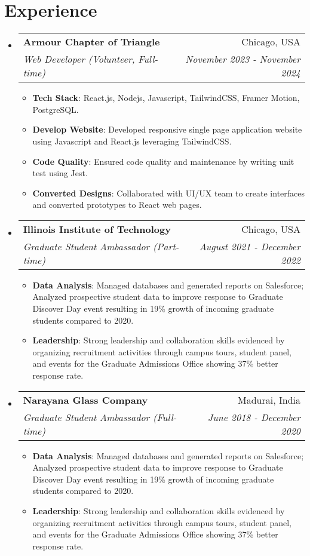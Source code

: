 \documentclass[a4paper,20pt]{article}
\makeatletter
\newcommand{\resumeItem}[2]{
  \item\small{
    \textbf{#1}{: #2 \vspace{-2pt}}
  }
}
\newcommand{\resumeSubheading}[4]{
  \vspace{-1pt}\item
    \begin{tabular*}{0.97\textwidth}{l@{\extracolsep{\fill}}r}
      \textbf{#1} & #2 \\
      \textit{#3} & \textit{#4} \\
    \end{tabular*}\vspace{-5pt}
}
\newcommand{\resumeSubHeadingListStart}{\begin{itemize}[leftmargin=*]}
\newcommand{\resumeSubHeadingListEnd}{\end{itemize}}
\newcommand{\resumeItemListStart}{\begin{itemize}}
\newcommand{\resumeItemListEnd}{\end{itemize}\vspace{-5pt}}
\makeatother
\begin{document}
\section{Experience}
  \resumeSubHeadingListStart
    \resumeSubheading{Armour Chapter of Triangle}{Chicago, USA}
    {Web Developer (Volunteer, Full-time)}{November 2023 - November 2024}
    \resumeItemListStart
        \resumeItem{Tech Stack}{React.js, Nodejs, Javascript, TailwindCSS, Framer Motion, PostgreSQL.}
        \resumeItem{Develop Website}
          {Developed responsive single page application website using Javascript and React.js leveraging TailwindCSS.}
        \resumeItem{Code Quality}
          {Ensured code quality and maintenance by writing unit test using Jest.}
        \resumeItem{Converted Designs}{Collaborated with UI/UX team to create interfaces and converted prototypes to React web pages.}
      \resumeItemListEnd
\vspace{-5pt}
    \resumeSubheading
		{Illinois Institute of Technology}{Chicago, USA}
		{Graduate Student Ambassador (Part-time)}{August 2021 -  December 2022}
		\resumeItemListStart
        \resumeItem{Data Analysis}
          {Managed databases and generated reports on Salesforce; Analyzed prospective student data to improve response
to Graduate Discover Day event resulting in 19\% growth of incoming graduate students compared to 2020.}
        \resumeItem{Leadership}
          {Strong leadership and collaboration skills evidenced by organizing recruitment activities through campus tours,
student panel, and events for the Graduate Admissions Office showing 37\% better response rate.}
		\resumeItemListEnd

    \resumeSubheading
		{Narayana Glass Company}{Madurai, India}
		{Graduate Student Ambassador (Full-time)}{June 2018 -  December 2020}
		\resumeItemListStart
        \resumeItem{Data Analysis}
          {Managed databases and generated reports on Salesforce; Analyzed prospective student data to improve response
to Graduate Discover Day event resulting in 19\% growth of incoming graduate students compared to 2020.}
        \resumeItem{Leadership}
          {Strong leadership and collaboration skills evidenced by organizing recruitment activities through campus tours,
student panel, and events for the Graduate Admissions Office showing 37\% better response rate.}
		\resumeItemListEnd

\resumeSubHeadingListEnd

\vspace{-5pt}
\end{document}
